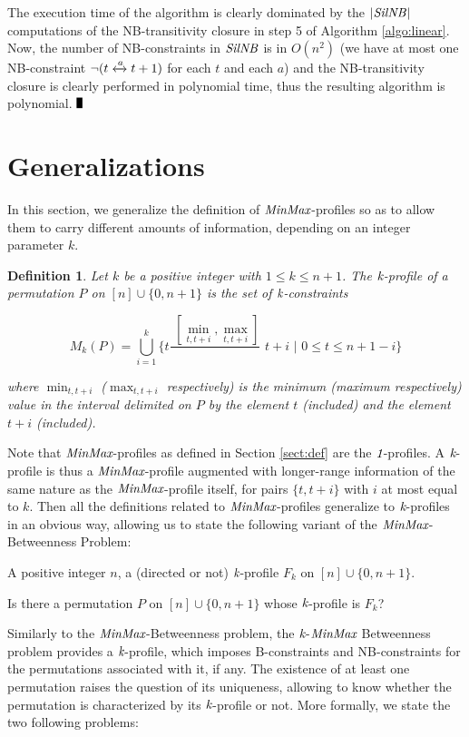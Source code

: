 \documentclass{article}
\newcommand{\M}{\mbox{\it MinMax}}
\newcommand{\kM}{\mbox{\it k}}
\newcommand{\oM}{\mbox{\it 1}}
\newcommand{\n}{[n]}
\newcommand{\lrf}[1]{\xleftrightarrow{#1}}
\newcommand{\Sil}{{\it SilNB}}
\newtheorem{defin}{Definition}
\newcommand{\bdefin}{\begin{defin}\rm}
\newcommand{\edefin}{\end{defin} }
\renewcommand{\Box}{\rule{1.5mm}{3mm}}
\begin{document}
The execution time of the algorithm is clearly dominated by the $|\Sil|$ computations of
the NB-transitivity closure in step 5 of Algorithm \ref{algo:linear}. Now, the number
of NB-constraints in $\Sil$ is in $O(n^2)$ (we have at most one NB-constraint $\neg(t\lrf{a}t+1)$ for each
$t$ and each $a$) and the NB-transitivity closure is clearly performed in polynomial time,
thus the resulting algorithm is polynomial.  $\Box$
 

\section{Generalizations}\label{sect:Generalizations}

In this section, we generalize the definition of $\M$-profiles so as to allow
them to carry different amounts of information, depending on an integer parameter $k$.

\bdefin
Let $k$ be a positive integer with $1\leq k\leq n+1$. The {\em $\kM$-profile of a permutation} $P$ on $\n\cup\{0,n+1\}$ 
is the set of {\em $\kM$-constraints}

$$M_k(P)=\bigcup_{i=1}^{k}\{t \frac{\,\, \scriptstyle{[\min_{t,t+i}, \max_{t,t+i}]}}{}\,\, t+i\,\, |\,\, 0\leq t\leq n+1-i\}$$

\noindent where $\min_{t,t+i}$ ($\max_{t,t+i}$ respectively) is the minimum (maximum respectively) value 
in the interval delimited on $P$ by the element $t$ (included) and the element $t+i$ (included). 
\edefin

 
Note that $\M$-profiles as defined in Section \ref{sect:def} are the $\oM$-profiles.
A $\kM$-profile is thus a $\M$-profile augmented with longer-range information of the same
nature as the $\M$-profile itself,  for pairs $\{t,t+i\}$ with $i$ at most equal to $k$.
Then all the definitions  related to $\M$-profiles generalize to $\kM$-profiles in an obvious way,
allowing us to state the following variant of the $\M$-Betweenness Problem:

\bigskip

\noindent {\sc (directed or not) $\kM$-$\M$  Betweenness}

 A positive integer $n$, a (directed or not) $\kM$-profile $F_k$ on $\n\cup \{0, n+1\}$. 

 Is there a permutation $P$ on $\n\cup\{0,n+1\}$ whose $\kM$-profile is $F_k$? 
\bigskip

Similarly to the $\M$-{\sc Betweenness} problem, the  $\kM$-$\M$ {\sc Betweenness} problem provides a $\kM$-profile,
which imposes B-constraints and NB-constraints for the permutations associated with it, if any. 
The existence of at least one permutation raises the question of its uniqueness,
allowing to know whether the permutation is characterized by its $\kM$-profile or not.
More formally, we state the two following problems:
\end{document}
